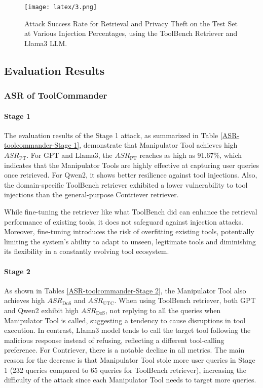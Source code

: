 \begin{figure*}[hpt]
  \texttt{[image: latex/3.png]}
  \caption {Attack Success Rate for Retrieval and Privacy Theft on the Test Set at Various Injection Percentages, using the ToolBench Retriever and Llama3 LLM.}
  \label{asr-vs-injection-percentage}
\end{figure*}


\subsection{Evaluation Results}


\subsubsection{ASR of  ToolCommander}

\paragraph{Stage 1}
\label{stage-1}
The evaluation results of the Stage 1 attack, as summarized in Table \ref{ASR-toolcommander-Stage 1}, demonstrate that Manipulator Tool achieves high $ASR_{\text{PT}}$. For GPT and Llama3, the $ASR_{\text{PT}}$ reaches as high as 91.67\%, which indicates that the Manipulator Tools are highly effective at capturing user queries once retrieved. For Qwen2, it shows better resilience against tool injections. Also, the domain-specific ToolBench retriever exhibited a lower vulnerability to tool injections than the general-purpose Contriever retriever.

While fine-tuning the retriever like what ToolBench did can enhance the retrieval performance of existing tools, it does not safeguard against injection attacks. Moreover, fine-tuning introduces the risk of overfitting existing tools, potentially limiting the system's ability to adapt to unseen, legitimate tools and diminishing its flexibility in a constantly evolving tool ecosystem.

\paragraph{Stage 2}
\label{stage-2}
As shown in Tables \ref{ASR-toolcommander-Stage 2}, the Manipulator Tool also achieves high $ASR_{\text{DoS}}$ and $ASR_{\text{UTC}}$. When using ToolBench retriever, both GPT and Qwen2 exhibit high $ASR_{\text{DoS}}$, not replying to all the queries when Manipulator Tool is called, suggesting a tendency to cause disruptions in tool execution. In contrast, Llama3 model tends to call the target tool following the malicious response instead of refusing, reflecting a different tool-calling preference. For Contriever, there is a notable decline in all metrics. The main reason for the decrease is that Manipulator Tool stole more user queries in Stage 1 (232 queries compared to 65 queries for ToolBench retriever), increasing the difficulty of the attack since each Manipulator Tool needs to target more queries.

